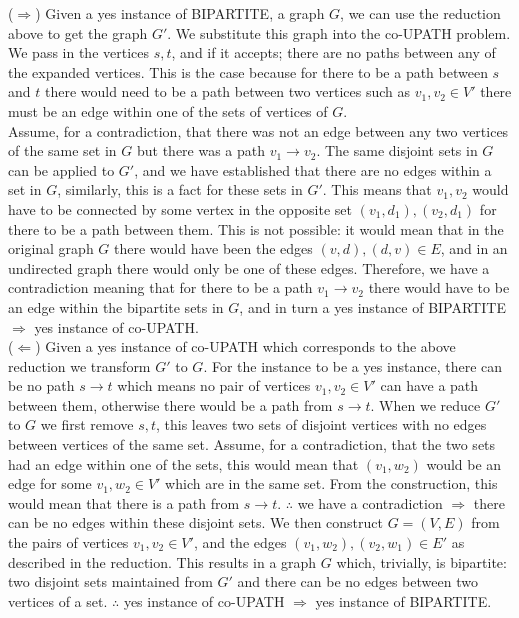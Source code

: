 \documentclass[12pt]{article}
\begin{document}
\begin{enumerate}
\begin{enumerate}
($\Rightarrow $) Given a yes instance of BIPARTITE, a graph $G$, we can use the reduction above to get the graph $G'$. We substitute this graph into the co-UPATH problem. We pass in the vertices $s,t$, and if it accepts; there are no paths between any of the expanded vertices. This is the case because for there to be a path between $s$ and $t$ there would need to be a path between two vertices such as $v_1,v_2 \in V'$ there must be an edge within one of the sets of vertices of $G$. \\Assume, for a contradiction, that there was not an edge between any two vertices of the same set in $G$ but there was a path $v_1\rightarrow v_2$. The same disjoint sets in $G$ can be applied to $G'$, and we have established that there are no edges within a set in $G$, similarly, this is a fact for these sets in $G'$. This means that $v_1,v_2$ would have to be connected by some vertex in the opposite set $(v_1,d_1),(v_2,d_1)$ for there to be a path between them. This is not possible: it would mean that in the original graph $G$ there would have been the edges $(v,d),(d,v)\in E$, and in an undirected graph there would only be one of these edges. Therefore, we have a contradiction meaning that for there to be a path $v_1\rightarrow v_2$ there would have to be an edge within the bipartite sets in $G$, and in turn a yes instance of BIPARTITE $\Rightarrow $ yes instance of co-UPATH. \\
($\Leftarrow $) Given a yes instance of co-UPATH which corresponds to the above reduction we transform $G'$ to $G$. For the instance to be a yes instance, there can be no path $s\rightarrow t$ which means no pair of vertices $v_1,v_2 \in V'$ can have a path between them, otherwise there would be a path from $s\rightarrow t$. When we reduce $G'$ to $G$ we first remove $s,t$, this leaves two sets of disjoint vertices with no edges between vertices of the same set. Assume, for a contradiction, that the two sets had an edge within one of the sets, this would mean that $(v_1,w_2)$ would be an edge for some $v_1,w_2 \in V'$ which are in the same set. From the construction, this would mean that there is a path from $s\rightarrow t$. $\therefore $ we have a contradiction $\Rightarrow $ there can be no edges within these disjoint sets. We then construct $G=(V,E) $ from the pairs of vertices $v_1,v_2 \in V'$, and the edges $(v_1,w_2),(v_2,w_1) \in E'$ as described in the reduction. This results in a graph $G$ which, trivially, is bipartite: two disjoint sets maintained from $G'$ and there can be no edges between two vertices of a set. $\therefore $ yes instance of co-UPATH $\Rightarrow $ yes instance of BIPARTITE. \\

\end{enumerate}
\end{enumerate}
\end{document}
